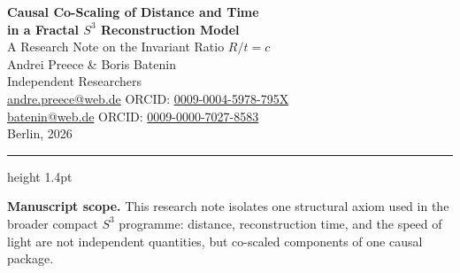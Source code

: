 \documentclass[11pt,a4paper]{article}
\newcommand{\Sthree}{S^{3}}
\begin{document}
\thispagestyle{empty}

\begin{center}
  {\LARGE\bfseries\color{deepblue}
    Causal Co-Scaling of Distance and Time\\[5pt]
    in a Fractal $\Sthree$ Reconstruction Model}\\[8pt]
  {\Large\color{midblue}A Research Note on the Invariant Ratio $R/t=c$}\\[18pt]
  {\large Andrei Preece \quad \& \quad Boris Batenin}\\[7pt]
  {\small Independent Researchers}\\[4pt]
  {\small
    \href{mailto:andre.preece@web.de}{andre.preece@web.de}\quad
    ORCID: \href{https://orcid.org/0009-0004-5978-795X}{0009-0004-5978-795X}\\[2pt]
    \href{mailto:batenin@web.de}{batenin@web.de}\quad
    ORCID: \href{https://orcid.org/0009-0000-7027-8583}{0009-0000-7027-8583}\\[7pt]
    Berlin, 2026
  }
\end{center}

\vspace{4pt}
{\color{midblue}\hrule height 1.4pt}
\vspace{12pt}

\begin{center}
\begin{minipage}{0.93\linewidth}
\textbf{Manuscript scope.}\;
This research note isolates one structural axiom used in the broader compact $\Sthree$
programme: distance, reconstruction time, and the speed of light are not independent
quantities, but co-scaled components of one causal package.
\end{minipage}
\end{center}

\vspace{8pt}
\end{document}

